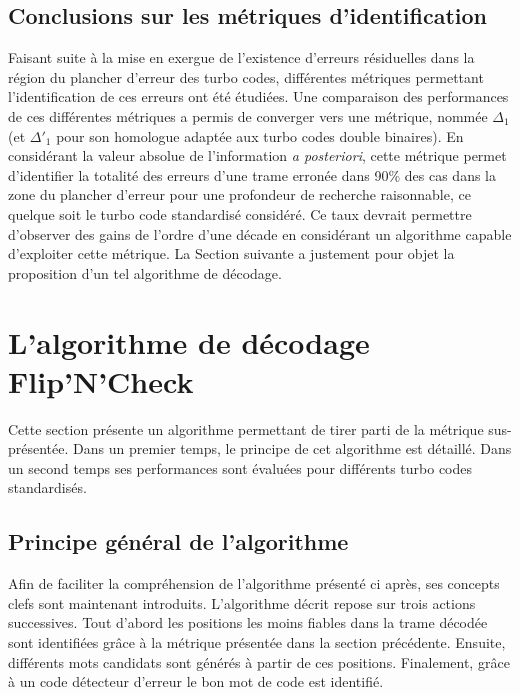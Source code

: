\subsection{Conclusions sur les métriques d'identification}
Faisant suite à la mise en exergue de l'existence d'erreurs résiduelles dans la région du plancher d'erreur des turbo codes,
différentes métriques permettant l'identification de ces erreurs ont été étudiées. Une comparaison des performances de ces 
différentes métriques a permis de converger vers une métrique, nommée $\Delta_1$ (et $\Delta'_1$ pour son homologue 
adaptée aux turbo codes double binaires). En considérant la valeur absolue de l'information \textit{a posteriori}, cette
métrique permet d'identifier la totalité des erreurs d'une trame erronée dans 90\% des cas dans la zone du plancher 
d'erreur pour une profondeur de recherche raisonnable, ce quelque soit le turbo code standardisé considéré. Ce taux devrait
permettre d'observer des gains de l'ordre d'une décade en considérant un algorithme capable d'exploiter cette métrique. 
La Section suivante a justement pour 
objet la proposition d'un tel algorithme de décodage.

\section{L'algorithme de décodage Flip'N'Check}
Cette section présente un algorithme permettant de tirer parti de la métrique sus-présentée.
Dans un premier temps, le principe de cet algorithme est détaillé. Dans un second temps ses performances sont évaluées 
pour différents turbo codes standardisés.


\subsection{Principe général de l'algorithme}
Afin de faciliter la compréhension de l'algorithme présenté ci après, ses concepts clefs sont maintenant introduits.
L'algorithme décrit repose sur trois actions successives. Tout d'abord les positions les moins fiables dans la trame 
décodée sont identifiées grâce à la métrique présentée dans la section précédente. Ensuite, différents mots candidats sont générés
à partir de ces positions. Finalement, grâce à un code détecteur d'erreur le bon mot de code est identifié.

